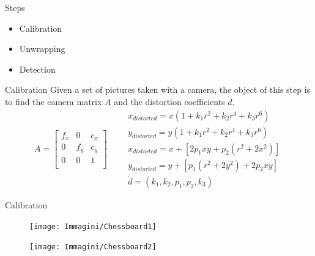 \begin{frame}[t,plain]
\titlepage
\end{frame}

\begin{frame}{Steps}
	\begin{itemize}
		\item Calibration
		\item Unwrapping
		\item Detection
	\end{itemize}
\end{frame}


\begin{frame}{Calibration}
	Given a set of pictures taken with a camera, the object of this step is to find the camera matrix $A$ and the distortion coefficients $\dot{d}$.\newline
	\vfill
	\[
		A=\begin{bmatrix}
			f_x&0&c_x\\
			0&f_y&c_y\\
			0&0&1\\
		\end{bmatrix}\qquad
		\begin{matrix}
			x_{distorted}=x\left(1+k_1r^2+k_2r^4+k_3r^6\right)\\
			y_{distorted}=y\left(1+k_1r^2+k_2r^4+k_3r^6\right)\\
			x_{distorted}=x+\left[2p_1xy+p_2\left(r^2+2x^2\right)\right]\\
			y_{distorted}=y+\left[p_1\left(r^2+2y^2\right)+2p_2xy\right]\\
			\dot{d}=(k_1, k_2, p_1, p_2, k_3)
		\end{matrix}
	\]
	\vfill
\end{frame}


\begin{frame}{Calibration}
	\begin{figure}[H]
		\begin{minipage}{0.48\linewidth}
			\texttt{[image: Immagini/Chessboard1]}
		\end{minipage}
		\vspace{0.04\linewidth}
		\begin{minipage}{0.48\linewidth}
			\texttt{[image: Immagini/Chessboard2]}
		\end{minipage}
	\end{figure}
\end{frame}



